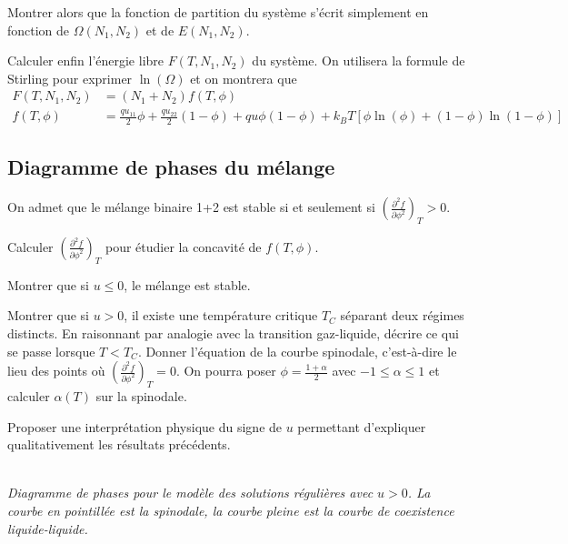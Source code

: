 \documentclass[utf8, 11pt]{feuille}
\begin{document}
\question
Montrer alors que la fonction de partition du système s'écrit simplement en fonction de $\Omega(N_1, N_2)$ et de $E(N_1, N_2)$.

\question
Calculer enfin l'énergie libre $F(T,N_1,N_2)$ du système. On utilisera la formule de Stirling pour exprimer $\ln ( \Omega)$ et on montrera que
\begin{align*}
F(T,N_1,N_2)&=(N_1+N_2)f(T,\phi)\\
f(T,\phi)&=\frac{qu_{11}}{2} \phi +\frac{qu_{22}}{2} (1-\phi) +q u \phi(1-\phi)+k_BT \left[ \phi \ln (\phi)+(1-\phi) \ln (1-\phi) \right]
\end{align*}

\subsection*{Diagramme de phases du mélange}

On admet que le mélange binaire 1+2 est stable si et seulement si $\left(\frac{\partial^2f}{\partial \phi^2}\right)_T >0$.

\question
Calculer $\left(\frac{\partial^2f}{\partial \phi^2}\right)_T$ pour étudier la concavité de $f(T,\phi)$.

\question
Montrer que si $u \le 0$, le mélange est stable.

\question
Montrer que si $u > 0$, il existe une température critique $T_C$ séparant deux régimes distincts. En raisonnant par analogie avec la transition gaz-liquide, décrire ce qui se passe lorsque $T < T_C$. Donner l'équation de la courbe spinodale, c'est-à-dire le lieu des points où $\left(\frac{\partial^2f}{\partial \phi^2}\right)_T=0$. On pourra poser $\phi=\frac{1+\alpha}{2}$ avec $-1 \le \alpha \le 1$ et calculer $\alpha (T)$ sur la spinodale.

\question
Proposer une interprétation physique du signe de $u$ permettant d'expliquer qualitativement les résultats précédents.


\begin{center} \\
\textit{Diagramme de phases pour le modèle des solutions régulières avec $u > 0$. La courbe en pointillée est la spinodale, la courbe pleine est la courbe de coexistence liquide-liquide.}
\label{DPMB}
\end{center}
\end{document}
